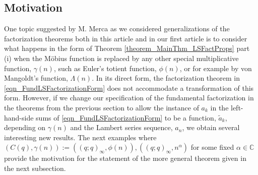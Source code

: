 \documentclass[10pt,reqno]{amsart}
\numberwithin{figure}{section}
\numberwithin{table}{section}
\theoremstyle{plain}
\numberwithin{theorem}{section}
\theoremstyle{remark}
\begin{document}
\subsection{Motivation} 

One topic suggested by M. Merca as we considered generalizations of the factorization theorems 
both in this article and in our first article \cite{MERCA-SCHMIDT1} is to consider what happens in the 
form of Theorem \ref{theorem_MainThm_LSFactProps} part (i) when the 
M\"obius function is replaced by any other special 
multiplicative function, $\gamma(n)$, such as Euler's totient function, $\phi(n)$, or for example by 
von Mangoldt's function, $\Lambda(n)$. In its direct form, the factorization theorem in 
\eqref{eqn_FundLSFactorizationForm} does not accommodate a transformation of this form. 
However, if we change our specification of the fundamental factorization in the theorems from the 
previous section to allow the instance of $a_k$ in the left-hand-side sums of 
\eqref{eqn_FundLSFactorizationForm} to be a function, $\widetilde{a}_k$, 
depending on $\gamma(n)$ and the Lambert series sequence, $a_n$, 
we obtain several interesting new results. The next examples where 
$(C(q), \gamma(n)) := ((q; q)_{\infty}, \phi(n)), ((q; q)_{\infty}, n^{\alpha})$ for some fixed 
$\alpha \in \mathbb{C}$ provide the motivation for the statement of the more general theorem 
given in the next subsection. 
\end{document}
